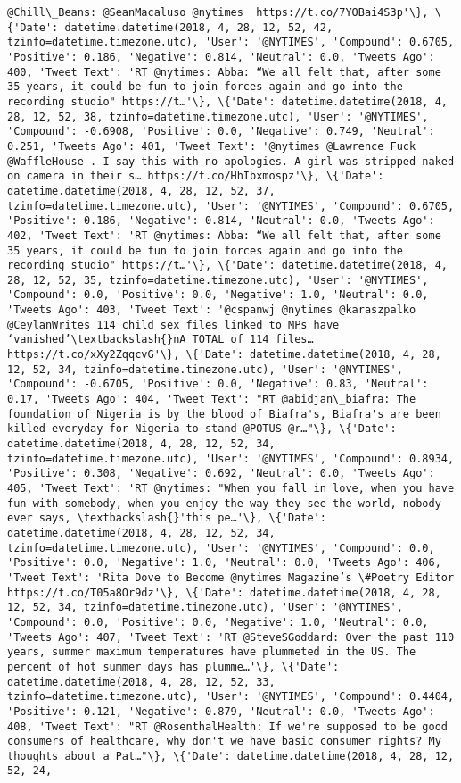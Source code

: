 \documentclass[11pt]{article}
\begin{document}
\begin{Verbatim}[commandchars=\\\{\}]
@Chill\_Beans: @SeanMacaluso @nytimes  https://t.co/7YOBai4S3p'\}, \{'Date': datetime.datetime(2018, 4, 28, 12, 52, 42, tzinfo=datetime.timezone.utc), 'User': '@NYTIMES', 'Compound': 0.6705, 'Positive': 0.186, 'Negative': 0.814, 'Neutral': 0.0, 'Tweets Ago': 400, 'Tweet Text': 'RT @nytimes: Abba: “We all felt that, after some 35 years, it could be fun to join forces again and go into the recording studio" https://t…'\}, \{'Date': datetime.datetime(2018, 4, 28, 12, 52, 38, tzinfo=datetime.timezone.utc), 'User': '@NYTIMES', 'Compound': -0.6908, 'Positive': 0.0, 'Negative': 0.749, 'Neutral': 0.251, 'Tweets Ago': 401, 'Tweet Text': '@nytimes @Lawrence Fuck @WaffleHouse . I say this with no apologies. A girl was stripped naked on camera in their s… https://t.co/HhIbxmospz'\}, \{'Date': datetime.datetime(2018, 4, 28, 12, 52, 37, tzinfo=datetime.timezone.utc), 'User': '@NYTIMES', 'Compound': 0.6705, 'Positive': 0.186, 'Negative': 0.814, 'Neutral': 0.0, 'Tweets Ago': 402, 'Tweet Text': 'RT @nytimes: Abba: “We all felt that, after some 35 years, it could be fun to join forces again and go into the recording studio" https://t…'\}, \{'Date': datetime.datetime(2018, 4, 28, 12, 52, 35, tzinfo=datetime.timezone.utc), 'User': '@NYTIMES', 'Compound': 0.0, 'Positive': 0.0, 'Negative': 1.0, 'Neutral': 0.0, 'Tweets Ago': 403, 'Tweet Text': '@cspanwj @nytimes @karaszpalko @CeylanWrites 114 child sex files linked to MPs have ‘vanished’\textbackslash{}nA TOTAL of 114 files… https://t.co/xXy2ZqqcvG'\}, \{'Date': datetime.datetime(2018, 4, 28, 12, 52, 34, tzinfo=datetime.timezone.utc), 'User': '@NYTIMES', 'Compound': -0.6705, 'Positive': 0.0, 'Negative': 0.83, 'Neutral': 0.17, 'Tweets Ago': 404, 'Tweet Text': "RT @abidjan\_biafra: The foundation of Nigeria is by the blood of Biafra's, Biafra's are been killed everyday for Nigeria to stand @POTUS @r…"\}, \{'Date': datetime.datetime(2018, 4, 28, 12, 52, 34, tzinfo=datetime.timezone.utc), 'User': '@NYTIMES', 'Compound': 0.8934, 'Positive': 0.308, 'Negative': 0.692, 'Neutral': 0.0, 'Tweets Ago': 405, 'Tweet Text': 'RT @nytimes: "When you fall in love, when you have fun with somebody, when you enjoy the way they see the world, nobody ever says, \textbackslash{}'this pe…'\}, \{'Date': datetime.datetime(2018, 4, 28, 12, 52, 34, tzinfo=datetime.timezone.utc), 'User': '@NYTIMES', 'Compound': 0.0, 'Positive': 0.0, 'Negative': 1.0, 'Neutral': 0.0, 'Tweets Ago': 406, 'Tweet Text': 'Rita Dove to Become @nytimes Magazine’s \#Poetry Editor https://t.co/T05a8Or9dz'\}, \{'Date': datetime.datetime(2018, 4, 28, 12, 52, 34, tzinfo=datetime.timezone.utc), 'User': '@NYTIMES', 'Compound': 0.0, 'Positive': 0.0, 'Negative': 1.0, 'Neutral': 0.0, 'Tweets Ago': 407, 'Tweet Text': 'RT @SteveSGoddard: Over the past 110 years, summer maximum temperatures have plummeted in the US. The percent of hot summer days has plumme…'\}, \{'Date': datetime.datetime(2018, 4, 28, 12, 52, 33, tzinfo=datetime.timezone.utc), 'User': '@NYTIMES', 'Compound': 0.4404, 'Positive': 0.121, 'Negative': 0.879, 'Neutral': 0.0, 'Tweets Ago': 408, 'Tweet Text': "RT @RosenthalHealth: If we're supposed to be good consumers of healthcare, why don't we have basic consumer rights? My thoughts about a Pat…"\}, \{'Date': datetime.datetime(2018, 4, 28, 12, 52, 24, 
\end{Verbatim}
\end{document}
